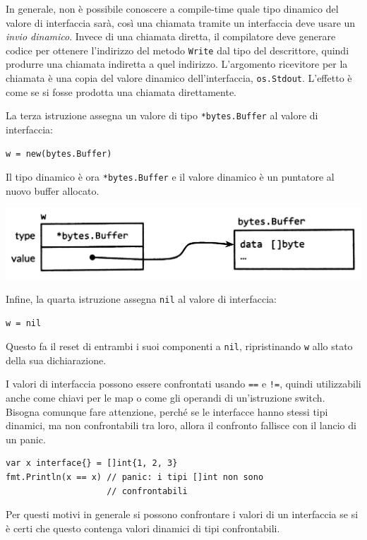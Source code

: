 In generale, non è possibile conoscere a compile-time quale tipo dinamico del valore di interfaccia sarà, così una chiamata tramite un interfaccia deve usare un \textit{invio dinamico}.
Invece di una chiamata diretta, il compilatore deve generare codice per ottenere l'indirizzo del metodo \verb|Write| dal tipo del descrittore, quindi produrre una chiamata indiretta a quel indirizzo.
L'argomento ricevitore per la chiamata è una copia del valore dinamico dell'interfaccia, \verb|os.Stdout|.
L'effetto è come se si fosse prodotta una chiamata direttamente.

La terza istruzione assegna un valore di tipo \verb|*bytes.Buffer| al valore di interfaccia:
\begin{lstlisting}[frame=single, label={lst:lstlisting6-5.4}]
w = new(bytes.Buffer)
\end{lstlisting}
Il tipo dinamico è ora \verb|*bytes.Buffer| e il valore dinamico è un puntatore al nuovo buffer allocato.
\begin{center}
    \includegraphics[width=0.5\linewidth]{figures/figura6.3}
\end{center}

Infine, la quarta istruzione assegna \verb|nil| al valore di interfaccia:
\begin{lstlisting}[frame=single, label={lst:lstlisting6-5.5}]
w = nil
\end{lstlisting}
Questo fa il reset di entrambi i suoi componenti a \verb|nil|, ripristinando \verb|w| allo stato della sua dichiarazione.

I valori di interfaccia possono essere confrontati usando \verb|==| e \verb|!=|, quindi utilizzabili anche come chiavi per le map o come gli operandi di un'istruzione switch.
Bisogna comunque fare attenzione, perché se le interfacce hanno stessi tipi dinamici, ma non confrontabili tra loro, allora il confronto fallisce con il lancio di un panic.
\begin{lstlisting}[frame=single, label={lst:lstlisting6-5.6}]
var x interface{} = []int{1, 2, 3}
fmt.Println(x == x) // panic: i tipi []int non sono
                    // confrontabili
\end{lstlisting}
Per questi motivi in generale si possono confrontare i valori di un interfaccia se si è certi che questo contenga valori dinamici di tipi confrontabili.